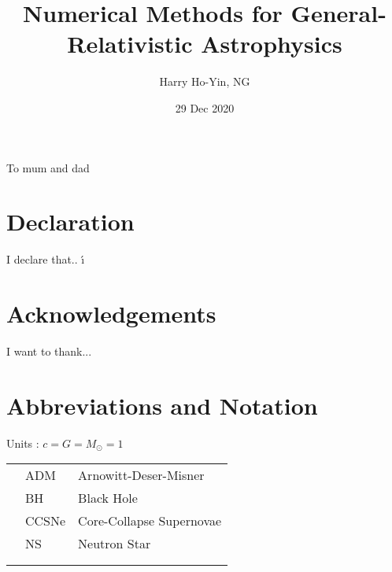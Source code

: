 \documentclass[12pt,twoside]{report}
\title{Numerical Methods for General-Relativistic Astrophysics}
\author{Harry Ho-Yin, NG}
\date{29 Dec 2020}
\begin{document}




\chapter*{}
To mum and dad

\chapter*{Declaration}
I declare that..
\'\i

\chapter*{Acknowledgements}
I want to thank...

\chapter*{Abbreviations and Notation}
Units : $c = G = M_{\odot} = 1$
\begin{table}[h]
	\begin{tabular}{lll}
		&ADM  &Arnowitt-Deser-Misner \\
		&BH  &Black Hole    \\
		&CCSNe  &Core-Collapse Supernovae    \\
		&NS  &Neutron Star  \\
		&  & \\
		&  &  \\
	\end{tabular}
\end{table}




\tableofcontents


\setcounter{secnumdepth}{3}
\setcounter{tocdepth}{3}
\end{document}

